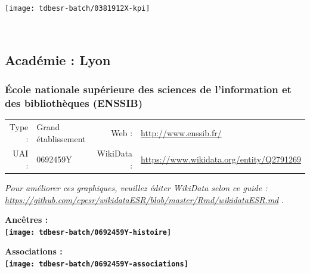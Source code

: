 \documentclass[12pt,french,]{article}
\begin{document}
\begin{center}\texttt{[image: tdbesr-batch/0381912X-kpi]} \end{center}\checkoddpage

\ifoddpage \fi ~\newpage  

\hypertarget{acaduxe9mie-lyon-1}{%
\subsection{Académie : Lyon}\label{acaduxe9mie-lyon-1}}

\hypertarget{uxe9cole-nationale-supuxe9rieure-des-sciences-de-linformation-et-des-bibliothuxe8ques-enssib}{%
\subsubsection{École nationale supérieure des sciences de l'information
et des bibliothèques
(ENSSIB)}\label{uxe9cole-nationale-supuxe9rieure-des-sciences-de-linformation-et-des-bibliothuxe8ques-enssib}}

\begin{tabular*}{\textwidth}{rp{5cm}rl}  
\hline  
Type : & Grand établissement & Web : &\href{http://www.enssib.fr/}{http://www.enssib.fr/} \\  
UAI : & 0692459Y & WikiData : & \href{https://www.wikidata.org/entity/Q2791269}{https://www.wikidata.org/entity/Q2791269} \\  
\hline  
\end{tabular*}

\textit{\scriptsize Pour améliorer ces graphiques, veuillez éditer WikiData selon ce guide :  \href{https://github.com/cpesr/wikidataESR/blob/master/Rmd/wikidataESR.md}{https://github.com/cpesr/wikidataESR/blob/master/Rmd/wikidataESR.md}}
.

\vspace{1cm}  
\begin{minipage}[b]{0.50\textwidth}\begin{center} \bf Ancêtres : \\  
\texttt{[image: tdbesr-batch/0692459Y-histoire]} \end{center}\end{minipage}\begin{minipage}[b]{0.50\textwidth}\begin{center} \bf Associations : \\  
\texttt{[image: tdbesr-batch/0692459Y-associations]} \end{center}\end{minipage}
\end{document}
